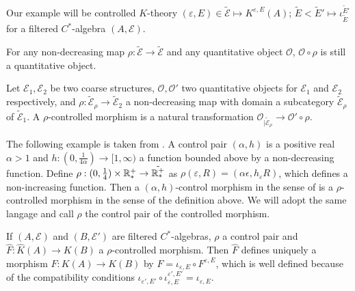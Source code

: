 \begin{Expl}Our example will be controlled $K$-theory $(\varepsilon,E)\in\mathcal{\tilde E}\mapsto K^{\varepsilon,E}(A)$; $\tilde E <\tilde E'\mapsto \iota_{\tilde E}^{\tilde E'}$ for a filtered $C^*$-algebra $(A,\mathcal E)$.\end{Expl}

\begin{rk}For any non-decreasing map $\rho : \mathcal{\tilde E}\rightarrow \mathcal{\tilde E}$ and any quantitative object $\mathcal O$, $\mathcal O\circ \rho $ is still a quantitative object. \end{rk}

\begin{definition}Let $\mathcal E_1,\mathcal E_2$ be two coarse structures, $\mathcal O,\mathcal O'$ two quantitative objects for $\mathcal E_1$ and $\mathcal E_2$ respectively, and $\rho : \mathcal{\tilde E}_\rho\rightarrow \mathcal{\tilde E}_2$ a non-decreasing map with domain a subcategory $\mathcal{\tilde E}_\rho$ of $\mathcal{\tilde E}_1$. A $\rho$-controlled morphism is a natural transformation $\mathcal O_{|\mathcal{\tilde E}_\rho} \rightarrow \mathcal O'\circ \rho$.\end{definition}

\begin{Expl}
The following example is taken from \cite{OY2}. A control pair $(\alpha,h)$ is a positive real $\alpha>1$ and $h:(0,\frac{1}{4\alpha})\rightarrow [1,\infty)$ a function bounded above by a non-decreasing function. Define $\rho : (0,\frac{1}{4})\times\mathbb R_*^+\rightarrow \tilde{\mathbb R_*^+}$ as $\rho(\varepsilon, R)=(\alpha \epsilon,h_\varepsilon R)$, which defines a non-increasing function. Then a $(\alpha,h)$-control morphism in the sense of \cite{OY2} is a $\rho$-controlled morphism in the sense of the definition above. We will adopt the same langage and call $\rho$ the control pair of the controlled morphism.
\end{Expl}

\begin{rk}
If $(A,\mathcal E)$ and $(B,\mathcal E')$ are filtered $C^*$-algebras, $\rho$ a control pair and $\hat F : \hat K(A)\rightarrow K(B)$ a $\rho$-controlled morphism. Then $\hat F$ defines uniquely a morphism $F : K(A)\rightarrow K(B)$ by $F=\iota_{\varepsilon, E}\circ F^{\varepsilon,E}$, which is well defined because of the compatibility conditions $\iota_{\varepsilon',E'}\circ\iota_{\varepsilon,E}^{\varepsilon',E'}=\iota_{\varepsilon, E}$. 
\end{rk}

